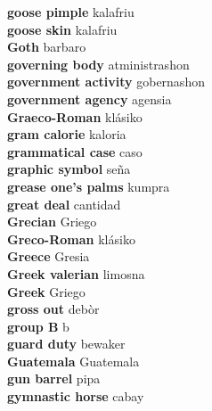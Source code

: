 \textbf{ goose pimple  } kalafriu \\
\textbf{ goose skin  } kalafriu \\
\textbf{ Goth  } barbaro \\
\textbf{ governing body  } atministrashon \\
\textbf{ government activity  } gobernashon \\
\textbf{ government agency  } agensia \\
\textbf{ Graeco-Roman  } klásiko \\
\textbf{ gram calorie  } kaloria \\
\textbf{ grammatical case  } caso \\
\textbf{ graphic symbol  } seña \\
\textbf{ grease one’s palms  } kumpra \\
\textbf{ great deal  } cantidad \\
\textbf{ Grecian  } Griego \\
\textbf{ Greco-Roman  } klásiko \\
\textbf{ Greece  } Gresia \\
\textbf{ Greek valerian  } limosna \\
\textbf{ Greek  } Griego \\
\textbf{ gross out  } debòr \\
\textbf{ group B  } b \\
\textbf{ guard duty  } bewaker \\
\textbf{ Guatemala  } Guatemala \\
\textbf{ gun barrel  } pipa \\
\textbf{ gymnastic horse  } cabay \\
